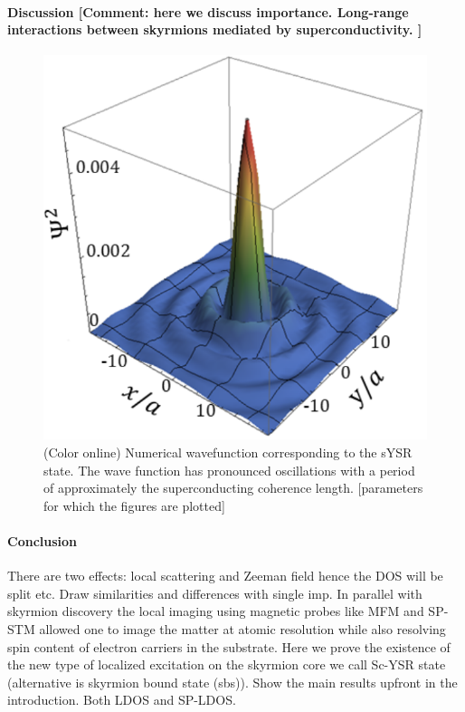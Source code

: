 \documentclass[twocolumn,showpacs,floatfix,nofootinbib,longbibliography]{revtex4-1}
\begin{document}
\paragraph*{Discussion [Comment: here we discuss importance. Long-range interactions between skyrmions mediated by superconductivity. ] } \label{sec:discussion}
\begin{figure} \centering
\includegraphics[width=0.7\linewidth]{WaveFunction}
\caption{(Color online) Numerical wavefunction corresponding to the sYSR state. The wave function has pronounced oscillations with a period of approximately the superconducting coherence length. [parameters for which the figures are plotted]  } \label{fig:wavefunction}
\end{figure}




\paragraph*{Conclusion} \label{sec:conclusion}

There are two effects: local scattering and Zeeman field hence the DOS will be split etc.  Draw similarities and differences with single imp.
In parallel with skyrmion discovery the local imaging using magnetic probes like MFM and SP-STM allowed one to image the matter at atomic resolution while also resolving spin content of electron carriers in the substrate.
Here we prove the existence of the new type of localized excitation on the skyrmion core we call  Sc-YSR state (alternative is skyrmion bound state (sbs)).  Show the main results upfront in the introduction. Both LDOS and SP-LDOS.
\end{document}
